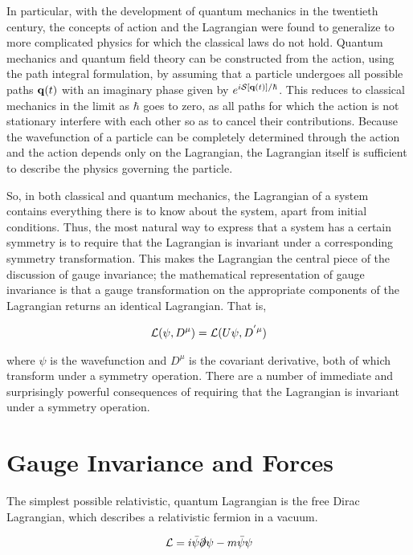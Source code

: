 In particular, with the development of quantum mechanics in the twentieth century, the concepts of action and the Lagrangian were found to generalize to more complicated physics for which the classical laws do not hold. 
Quantum mechanics and quantum field theory can be constructed from the action, using the path integral formulation, by assuming that a particle undergoes all possible paths $\mathbf{q}(t)$ with an imaginary phase given by $e^{i \mathcal{S}[\mathbf{q}(t)]/\hbar}$. 
This reduces to classical mechanics in the limit as $\hbar$ goes to zero, as all paths for which the action is not stationary interfere with each other so as to cancel their contributions. 
Because the  wavefunction of a particle can be completely determined through the action and the action depends only on the Lagrangian, the Lagrangian itself is sufficient to describe the physics governing the particle. 

So, in both classical and quantum mechanics, the Lagrangian of a system contains everything there is to know about the system, apart from initial conditions. 
Thus, the most natural way to express that a system has a certain symmetry is to require that the Lagrangian is invariant under a corresponding symmetry transformation. 
This makes the Lagrangian the central  piece of the discussion of gauge invariance; the mathematical representation of gauge invariance is that a gauge transformation on the appropriate components of the Lagrangian  returns an identical Lagrangian. That is,

\begin{align}
\mathcal{L}(\psi,D^{\mu}) = \mathcal{L}(U\psi, D^{'\mu})
\end{align}

\noindent where $\psi$ is the wavefunction and $D^{\mu}$ is the covariant derivative, both of which transform under a symmetry operation.
There are a number of immediate and surprisingly powerful consequences of requiring that the Lagrangian is invariant under a symmetry operation.

\section{Gauge Invariance and Forces}

The simplest possible relativistic, quantum Lagrangian is the free Dirac Lagrangian, which describes a relativistic fermion in a vacuum.

\begin{align}\label{eq:free_dirac} 
\mathcal{L} = i\bar{\psi}\slashed{\partial}\psi -m\bar{\psi}\psi 
\end{align}

